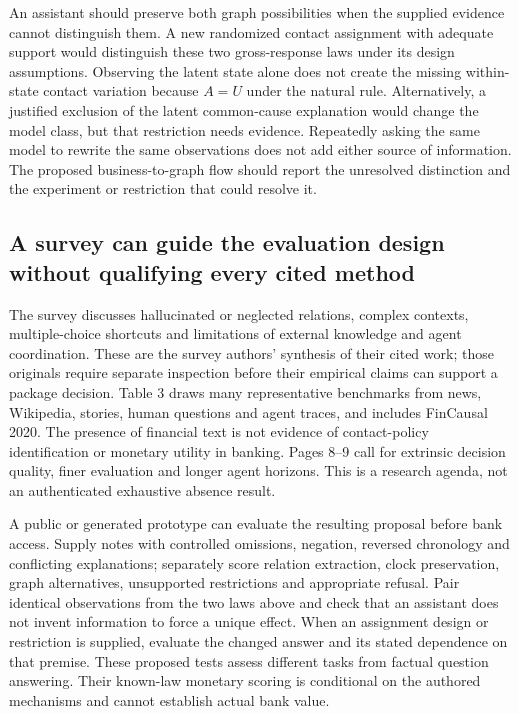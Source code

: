 An assistant should preserve both graph possibilities when the supplied
evidence cannot distinguish them. A new randomized contact assignment with
adequate support would distinguish these two gross-response laws under its
design assumptions. Observing the latent state alone does not create the
missing within-state contact variation because $A=U$ under the natural rule.
Alternatively, a justified exclusion of the latent common-cause explanation
would change the model class, but that restriction needs evidence. Repeatedly
asking the same model to rewrite the same observations does not add either
source of information. The proposed business-to-graph flow should report the
unresolved distinction and the experiment or restriction that could resolve it.

\subsection{A survey can guide the evaluation design without qualifying every cited method}
\label{exec23:context-evaluation}

The survey discusses hallucinated or neglected relations, complex contexts,
multiple-choice shortcuts and limitations of external knowledge and agent
coordination. These are the survey authors' synthesis of their cited work;
those originals require separate inspection before their empirical claims
can support a package decision. Table 3 draws many representative benchmarks
from news, Wikipedia, stories, human questions and agent traces, and includes
FinCausal 2020. The presence of financial text is not evidence of contact-policy
identification or monetary utility in banking. Pages 8--9 call for extrinsic
decision quality, finer evaluation and longer agent horizons. This is a
research agenda, not an authenticated exhaustive absence result.
\citep{exec23_contextual_causality_survey}

A public or generated prototype can evaluate the resulting proposal before
bank access. Supply notes with controlled omissions, negation, reversed
chronology and conflicting explanations; separately score relation extraction,
clock preservation, graph alternatives, unsupported restrictions and appropriate
refusal. Pair identical observations from the two laws above and check that an
assistant does not invent information to force a unique effect. When an
assignment design or restriction is supplied, evaluate the changed answer and
its stated dependence on that premise. These proposed tests assess different
tasks from factual question answering. Their known-law monetary scoring is
conditional on the authored mechanisms and cannot establish actual bank value.


